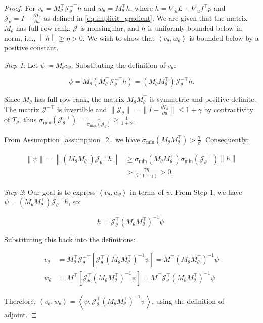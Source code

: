 \documentclass[letterpaper, 10 pt, conference]{ieeeconf}  %
\newcommand{\Jcal}{\mathcal{J}}
\newcommand{\T}{^{\top}}
\newcommand{\invT}{^{-\top}}
\newcommand{\norm}[1]{\left\lVert#1\right\rVert}
\newcommand{\inner}[2]{\left\langle #1, #2 \right\rangle}
\newcommand{\sigmin}{\sigma_{\min}}
\begin{document}
\begin{proof} 
For $v_\theta = M_{\theta}^\top \Jcal_{\theta}\invT h$ and $w_{\theta} = M_{\theta}\T h$, where $h = \nabla_u L + \nabla_u f\T p$ and $\Jcal_{\theta} = I - \frac{\partial T_{\theta}}{\partial u}$ as defined in \eqref{eq:implicit_gradient}. We are given that the matrix $M_{\theta}$ has full row rank, $\Jcal$ is nonsingular, and $h$ is uniformly bounded below in norm, i.e., $\norm{h} \geq \eta > 0$. We wish to show that $\inner{v_\theta}{w_\theta}$ is bounded below by a positive constant.

\textit{Step 1}: Let $\psi \coloneqq M_{\theta}v_{\theta}$. Substituting the definition of $v_{\theta}$:
\begin{small}
$$\psi = M_{\theta}(M_{\theta}^\top \Jcal_{\theta}\invT h) = (M_\theta M_\theta^\top)\Jcal_{\theta}\invT h.$$
\end{small}
Since $M_{\theta}$ has full row rank, the matrix $M_\theta M_\theta^\top$ is symmetric and positive definite. The matrix $\Jcal\invT$ is invertible and $\|\Jcal_{\theta}\| = \|I - \frac{\partial T_{\theta}}{\partial u}\| \leq 1+\gamma$ by contractivity of $T_\theta$, thus $\sigma_{\min} (\Jcal_{\theta}\invT) = \frac{1}{\sigma_{\max} (\Jcal_{\theta})} \geq \frac{1}{1+\gamma}$.

From Assumption~\ref{assumption_2}, we have $\sigma_{\min}(M_\theta M_\theta^\top) > \frac{\gamma}{\beta}$. Consequently:
\begin{small}
\begin{equation*}
\begin{aligned}
\norm{\psi} = \norm{(M_\theta M_\theta^\top)\Jcal_{\theta}\invT h} & \geq \sigmin(M_\theta M_\theta^\top)\sigmin(\Jcal_{\theta}\invT) \norm{h} \\
& > \frac{\gamma \eta}{\beta(1+\gamma)} >0.
\end{aligned}
\label{eq: psinorm}
\end{equation*}
\end{small}

\textit{Step 2}: Our goal is to express $\inner{v_\theta}{w_\theta}$ in terms of $\psi$. From Step 1, we have $\psi = (M_\theta M_\theta^\top)\Jcal_\theta\invT h$, so:
\begin{small}
$$h = \Jcal_{\theta}\T(M_\theta M_\theta^\top)^{-1}\psi.$$
\end{small}
Substituting this back into the definitions:
\begin{small}
\begin{align*}
v_{\theta} &= M_{\theta}^\top \Jcal_{\theta}\invT[\Jcal_{\theta}\T(M_\theta M_\theta^\top)^{-1}\psi] = M\T(M_\theta M_\theta^\top)^{-1}\psi \\
w_{\theta} &= M\T[\Jcal_{\theta}\T(M_\theta M_\theta^\top)^{-1}\psi] = M\T\Jcal_\theta\T(M_\theta M_\theta^\top)^{-1}\psi
\end{align*}
\end{small}
Therefore, $\inner{v_\theta}{w_\theta} = \inner{\psi}{\Jcal_\theta \T(M_\theta M_\theta^\top)^{-1}\psi}$, using the definition of adjoint.


\end{proof}
\end{document}

